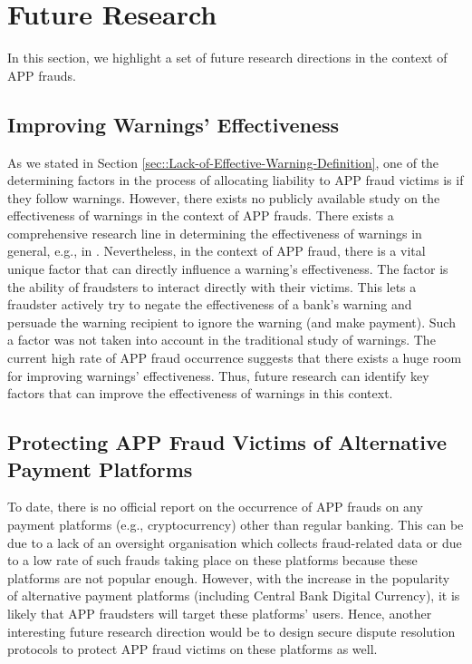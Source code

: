 

\section{Future Research}\label{sec::Future-Research}


In this section, we highlight a set of future research directions in the context of APP frauds. 



\vspace{-1mm}

\subsection{Improving Warnings' Effectiveness}

As we stated in  Section \ref{sec::Lack-of-Effective-Warning-Definition},  one of the determining factors in the process of allocating liability to APP fraud victims is if they follow warnings. However,  there exists no publicly available study on the effectiveness of warnings in  the context of APP frauds. There exists a comprehensive research line in determining the effectiveness of warnings in general, e.g., in \cite{brinton2016users,felt2014experimenting,laughery2006designing}. 
%
%
Nevertheless, in the context of APP fraud, there is a vital unique factor that can directly influence a warning's effectiveness. The factor is the ability of  fraudsters to interact directly with their victims. This lets a fraudster actively try to negate the effectiveness of a bank's warning and persuade the warning recipient to ignore the warning (and make payment). Such a factor was not taken into account in the traditional study of warnings. The current high rate of  APP fraud occurrence suggests that there exists a huge room for improving warnings' effectiveness. Thus, future research can identify key factors that can improve the effectiveness of warnings in this context. 

\vspace{-.5mm}
\subsection{Protecting APP Fraud Victims of Alternative Payment Platforms}

To date, there is no official report on the occurrence of APP frauds on any payment platforms (e.g., cryptocurrency) other than regular banking. This can be due to a lack of an oversight organisation which collects fraud-related data or due to a low rate of such frauds taking place on these platforms because these platforms are not popular enough. However,  with the increase in the popularity of alternative payment platforms (including Central Bank Digital Currency), it is likely that APP fraudsters will target these platforms' users. Hence, another interesting future research direction would be to design secure dispute resolution protocols to protect  APP fraud victims on these platforms as well. 

